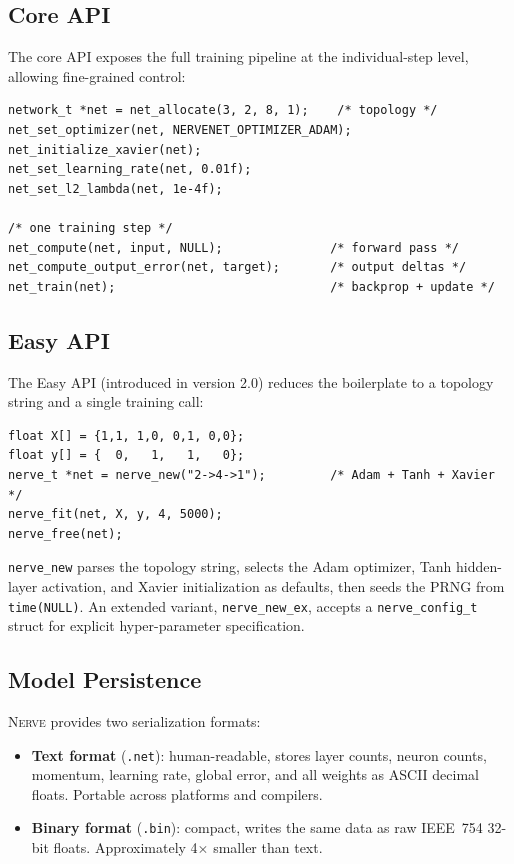 \documentclass[11pt,a4paper]{article}
\newcommand{\nerve}{\textsc{Nerve}}
\begin{document}
\subsection{Core API}

The core API exposes the full training pipeline at the individual-step level,
allowing fine-grained control:
\begin{lstlisting}[caption={Core API workflow}]
network_t *net = net_allocate(3, 2, 8, 1);    /* topology */
net_set_optimizer(net, NERVENET_OPTIMIZER_ADAM);
net_initialize_xavier(net);
net_set_learning_rate(net, 0.01f);
net_set_l2_lambda(net, 1e-4f);

/* one training step */
net_compute(net, input, NULL);               /* forward pass */
net_compute_output_error(net, target);       /* output deltas */
net_train(net);                              /* backprop + update */
\end{lstlisting}

\subsection{Easy API}

The Easy API (introduced in version 2.0) reduces the boilerplate to a
topology string and a single training call:
\begin{lstlisting}[caption={Easy API --- XOR in five lines}]
float X[] = {1,1, 1,0, 0,1, 0,0};
float y[] = {  0,   1,   1,   0};
nerve_t *net = nerve_new("2->4->1");         /* Adam + Tanh + Xavier */
nerve_fit(net, X, y, 4, 5000);
nerve_free(net);
\end{lstlisting}
\texttt{nerve\_new} parses the topology string, selects the Adam optimizer,
Tanh hidden-layer activation, and Xavier initialization as defaults, then
seeds the PRNG from \texttt{time(NULL)}. An extended variant,
\texttt{nerve\_new\_ex}, accepts a \texttt{nerve\_config\_t} struct for
explicit hyper-parameter specification.

\subsection{Model Persistence}

\nerve{} provides two serialization formats:
\begin{itemize}[leftmargin=2.4em]
  \item \textbf{Text format} (\texttt{.net}): human-readable, stores layer
    counts, neuron counts, momentum, learning rate, global error, and all
    weights as ASCII decimal floats. Portable across platforms and compilers.
  \item \textbf{Binary format} (\texttt{.bin}): compact, writes the same data
    as raw IEEE~754 32-bit floats. Approximately 4$\times$ smaller than text.
\end{itemize}
\end{document}
